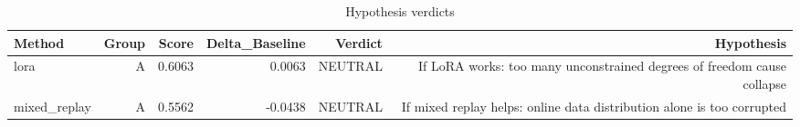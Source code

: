\begin{table}[htbp]
\centering
\caption{Hypothesis verdicts}
\label{tab:hyp-verdicts}
\begin{tabular}{lrrrrr}
\toprule
\textbf{Method} & \textbf{Group} & \textbf{Score} & \textbf{Delta\_Baseline} & \textbf{Verdict} & \textbf{Hypothesis} \\
\midrule
lora & A & 0.6063 & 0.0063 & NEUTRAL & If LoRA works: too many unconstrained degrees of freedom cause collapse \\
mixed\_replay & A & 0.5562 & -0.0438 & NEUTRAL & If mixed replay helps: online data distribution alone is too corrupted \\
\bottomrule
\end{tabular}
\end{table}